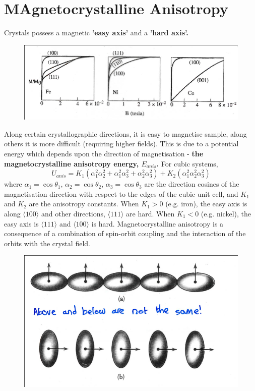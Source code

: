 \documentclass[a4paper, 11pt, normalem]{report}
\begin{document}
\section{MAgnetocrystalline Anisotropy}
Crystals possess a magnetic \textbf{'easy axis'} and a \textbf{'hard axis'.}
\begin{figure}[H]
    \centering
    \includegraphics[scale=0.5]{axes.png}
\end{figure}
Along certain crystallographic directions, it is easy to magnetise sample, along others it is more difficult (requiring higher fields).
This is due to a potential energy which depends upon the direction of magnetisation - \textbf{the magnetocrystalline anisotropy energy, $E_{anis}$.}
For cubic systems, 
\begin{equation}
    U_{anis} = K_1(\alpha_1^2\alpha_2^2 + \alpha_1^2\alpha_3^2 + \alpha_2^2\alpha_3^2) + K_2(\alpha_1^2\alpha_2^2\alpha_3^2)
\end{equation}
where $\alpha_1 = \cos\theta_1$, $\alpha_2=\cos\theta_2$, $\alpha_3=\cos\theta_3$ are the direction cosines of the magnetisation direction with respect to the edges of the cubic unit cell, and $K_1$ and $K_2$ are the anisotropy constants.
When $K_1>0$ (e.g. iron), the easy axis is along $\langle 100\rangle$ and other directions, $\langle 111\rangle$ are hard.
When $K_1<0$ (e.g. nickel), the easy axis is $\langle111\rangle$ and $\langle100\rangle$ is hard.
Magnetocrystalline anisotropy is a consequence of a combination of spin-orbit coupling and the interaction of the orbits with the crystal field.
\begin{figure}[H]
    \centering
    \includegraphics[scale=0.5]{anis.png}
\end{figure}
\end{document}
